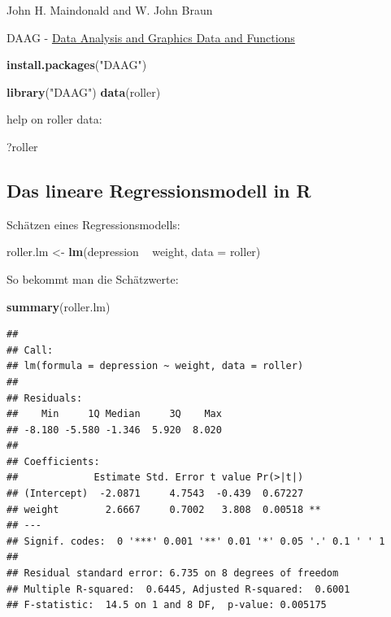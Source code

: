 \documentclass[]{article}
\newenvironment{Shaded}{\begin{snugshade}}{\end{snugshade}}
\newcommand{\KeywordTok}[1]{\textcolor[rgb]{0.13,0.29,0.53}{\textbf{{#1}}}}
\newcommand{\DataTypeTok}[1]{\textcolor[rgb]{0.13,0.29,0.53}{{#1}}}
\newcommand{\StringTok}[1]{\textcolor[rgb]{0.31,0.60,0.02}{{#1}}}
\newcommand{\NormalTok}[1]{{#1}}
\begin{document}
John H. Maindonald and W. John Braun

DAAG -
\href{http://cran.ms.unimelb.edu.au/web/packages/DAAG/DAAG.pdf}{Data
Analysis and Graphics Data and Functions}

\begin{Shaded}
\begin{Highlighting}[]
\KeywordTok{install.packages}\NormalTok{(}\StringTok{"DAAG"}\NormalTok{)}
\end{Highlighting}
\end{Shaded}

\begin{Shaded}
\begin{Highlighting}[]
\KeywordTok{library}\NormalTok{(}\StringTok{"DAAG"}\NormalTok{)}
\KeywordTok{data}\NormalTok{(roller)}
\end{Highlighting}
\end{Shaded}

help on roller data:

\begin{Shaded}
\begin{Highlighting}[]
\NormalTok{?roller}
\end{Highlighting}
\end{Shaded}

\subsection{Das lineare Regressionsmodell in
R}\label{das-lineare-regressionsmodell-in-r}

Schätzen eines Regressionsmodells:

\begin{Shaded}
\begin{Highlighting}[]
\NormalTok{roller.lm <-}\StringTok{ }\KeywordTok{lm}\NormalTok{(depression ~}\StringTok{ }\NormalTok{weight, }\DataTypeTok{data =} \NormalTok{roller)}
\end{Highlighting}
\end{Shaded}

So bekommt man die Schätzwerte:

\begin{Shaded}
\begin{Highlighting}[]
\KeywordTok{summary}\NormalTok{(roller.lm)}
\end{Highlighting}
\end{Shaded}

\begin{verbatim}
## 
## Call:
## lm(formula = depression ~ weight, data = roller)
## 
## Residuals:
##    Min     1Q Median     3Q    Max 
## -8.180 -5.580 -1.346  5.920  8.020 
## 
## Coefficients:
##             Estimate Std. Error t value Pr(>|t|)   
## (Intercept)  -2.0871     4.7543  -0.439  0.67227   
## weight        2.6667     0.7002   3.808  0.00518 **
## ---
## Signif. codes:  0 '***' 0.001 '**' 0.01 '*' 0.05 '.' 0.1 ' ' 1
## 
## Residual standard error: 6.735 on 8 degrees of freedom
## Multiple R-squared:  0.6445, Adjusted R-squared:  0.6001 
## F-statistic:  14.5 on 1 and 8 DF,  p-value: 0.005175
\end{verbatim}
\end{document}
